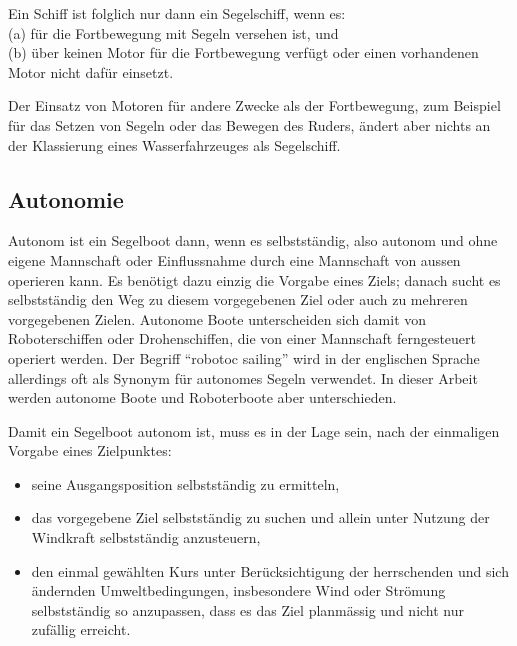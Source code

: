 Ein Schiff ist folglich nur dann ein Segelschiff, wenn es:\\
(a) für die Fortbewegung mit Segeln versehen ist, und\\
(b) über keinen Motor für die Fortbewegung verfügt oder einen vorhandenen Motor nicht dafür einsetzt. 

Der Einsatz von Motoren für andere Zwecke als der Fortbewegung, zum Beispiel für das Setzen von Segeln oder das Bewegen des Ruders, ändert aber nichts an der Klassierung eines Wasserfahrzeuges als Segelschiff. 

\subsection{Autonomie}
Autonom ist ein Segelboot dann, wenn es selbstständig, also autonom und ohne eigene Mannschaft oder Einflussnahme durch eine Mannschaft von aussen operieren kann. Es benötigt dazu einzig die Vorgabe eines Ziels; danach sucht es selbstständig den Weg zu diesem vorgegebenen Ziel oder auch zu mehreren vorgegebenen Zielen. Autonome Boote unterscheiden sich damit von Roboterschiffen oder Drohenschiffen, die von einer Mannschaft ferngesteuert operiert werden. Der Begriff \enquote{robotoc sailing} wird in der englischen Sprache allerdings oft als Synonym für autonomes Segeln verwendet. In dieser Arbeit werden autonome Boote und  Roboterboote aber unterschieden.

Damit ein Segelboot autonom ist, muss es in der Lage sein, nach der einmaligen Vorgabe eines Zielpunktes: 
\begin{itemize}
    \item seine Ausgangsposition selbstständig zu ermitteln,
    \item das vorgegebene Ziel selbstständig zu suchen und allein unter Nutzung der Windkraft selbstständig anzusteuern,
    \item den einmal gewählten Kurs unter Berücksichtigung der herrschenden und sich ändernden Umweltbedingungen, insbesondere Wind oder Strömung selbstständig so anzupassen, dass es das Ziel planmässig und nicht nur zufällig erreicht.
\end{itemize}
